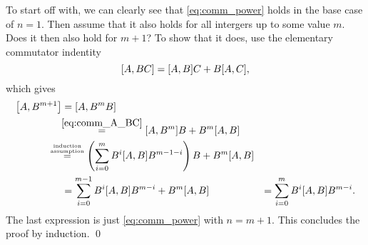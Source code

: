 \documentclass[11pt,letter, swedish, english
]{article}
\begin{document}
To start off with, we can clearly see that \eqref{eq:comm_power} holds
in the base case of $n=1$. Then assume that it also holds for all
intergers up to some value $m$. Does it then also hold for $m+1$?
To show that it does, use the elementary commutator
indentity
\begin{equation} \label{eq:comm_A_BC}
\comm{A}{BC} = \comm{A}{B}C+B\comm{A}{C},
\end{equation}
which gives
\begin{equation}
\begin{aligned}
\comm{A}{B^{m+1}} &= \comm{A}{B^{m}B} \\
&\hspace{-3pt}\stackrel{\eqref{eq:comm_A_BC}}{=} \comm{A}{B^{m}}B + B^m\comm{A}{B}\\
&\hspace{-14pt}\stackrel{\stackrel{\text{\tiny induction}}{\text{\tiny assumption}}}{=}
\left(\sum_{i=0}^{m} B^{i}\comm{A}{B}B^{m-1-i}\right) B + B^m\comm{A}{B}\\
&=\sum_{i=0}^{m-1} B^{i}\comm{A}{B}B^{m-i} + B^m\comm{A}{B}&=\sum_{i=0}^{m} B^{i}\comm{A}{B}B^{m-i}.
\end{aligned}
\end{equation}
The last expression is just \eqref{eq:comm_power} with $n=m+1$. This
concludes the proof by induction. \qed
\end{document}

